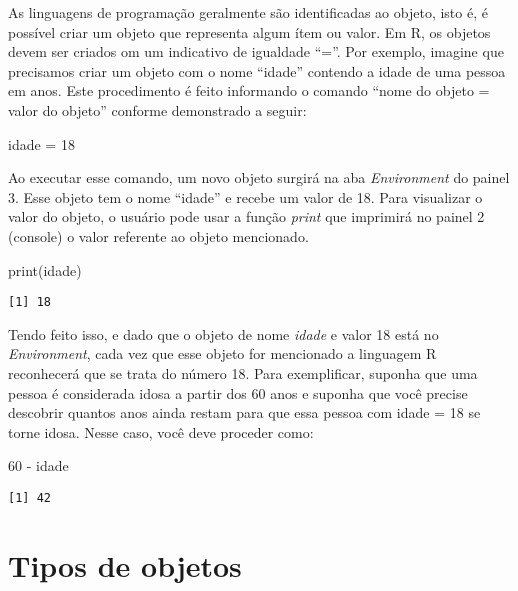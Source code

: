\documentclass[
  letterpaper,
  DIV=11,
  numbers=noendperiod]{scrreprt}
\newenvironment{Shaded}{\begin{snugshade}}{\end{snugshade}}
\newcommand{\DecValTok}[1]{\textcolor[rgb]{0.68,0.00,0.00}{#1}}
\newcommand{\FunctionTok}[1]{\textcolor[rgb]{0.28,0.35,0.67}{#1}}
\newcommand{\NormalTok}[1]{\textcolor[rgb]{0.00,0.23,0.31}{#1}}
\newcommand{\OtherTok}[1]{\textcolor[rgb]{0.00,0.23,0.31}{#1}}
\newcommand{\SpecialCharTok}[1]{\textcolor[rgb]{0.37,0.37,0.37}{#1}}
\begin{document}
As linguagens de programação geralmente são identificadas ao objeto,
isto é, é possível criar um objeto que representa algum ítem ou valor.
Em R, os objetos devem ser criados om um indicativo de igualdade ``=''.
Por exemplo, imagine que precisamos criar um objeto com o nome ``idade''
contendo a idade de uma pessoa em anos. Este procedimento é feito
informando o comando ``nome do objeto = valor do objeto'' conforme
demonstrado a seguir:

\begin{Shaded}
\begin{Highlighting}[]
\NormalTok{idade }\OtherTok{=} \DecValTok{18}
\end{Highlighting}
\end{Shaded}

Ao executar esse comando, um novo objeto surgirá na aba
\emph{Environment} do painel 3. Esse objeto tem o nome ``idade'' e
recebe um valor de 18. Para visualizar o valor do objeto, o usuário pode
usar a função \emph{print} que imprimirá no painel 2 (console) o valor
referente ao objeto mencionado.

\begin{Shaded}
\begin{Highlighting}[]
\FunctionTok{print}\NormalTok{(idade)}
\end{Highlighting}
\end{Shaded}

\begin{verbatim}
[1] 18
\end{verbatim}

Tendo feito isso, e dado que o objeto de nome \emph{idade} e valor 18
está no \emph{Environment}, cada vez que esse objeto for mencionado a
linguagem R reconhecerá que se trata do número 18. Para exemplificar,
suponha que uma pessoa é considerada idosa a partir dos 60 anos e
suponha que você precise descobrir quantos anos ainda restam para que
essa pessoa com idade = 18 se torne idosa. Nesse caso, você deve
proceder como:

\begin{Shaded}
\begin{Highlighting}[]
\DecValTok{60} \SpecialCharTok{{-}}\NormalTok{ idade}
\end{Highlighting}
\end{Shaded}

\begin{verbatim}
[1] 42
\end{verbatim}

\section{Tipos de objetos}\label{tipos-de-objetos}
\end{document}
